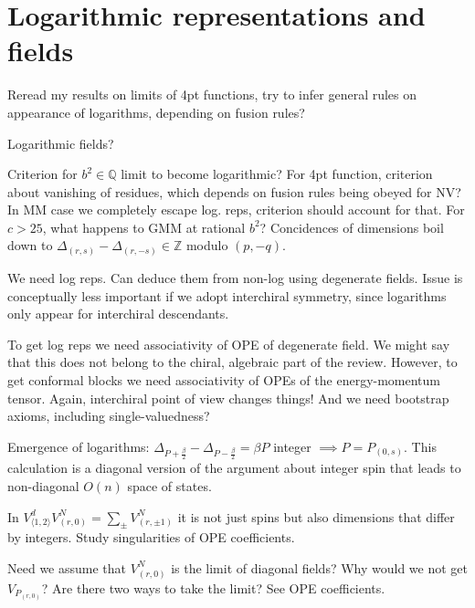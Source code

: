 \documentclass[12pt, a4paper]{article}
\theoremstyle{break}
\begin{document}
\section{Logarithmic representations and fields} \label{sec:log}

Reread my results on limits of 4pt functions, try to infer general rules on appearance of logarithms, depending on fusion rules?

Logarithmic fields?

Criterion for $b^2\in\mathbb{Q}$ limit to become logarithmic? For 4pt function, criterion about vanishing of residues, which depends on fusion rules being obeyed for NV? In MM case we completely escape log. reps, criterion should account for that.  
For $c>25$, what happens to GMM at rational $b^2$? Concidences of dimensions boil down to $\Delta_{(r,s)}-\Delta_{(r,-s)} \in \mathbb{Z}$ modulo $(p, -q)$. 

We need log reps. Can deduce them from non-log using degenerate fields. Issue is conceptually less important if we adopt interchiral symmetry, since logarithms only appear for interchiral descendants. 

To get log reps we need associativity of OPE of degenerate field. We might say that this does not belong to the chiral, algebraic part of the review. However, to get conformal blocks we need associativity of OPEs of the energy-momentum tensor. Again, interchiral point of view changes things! And we need bootstrap axioms, including single-valuedness? 

Emergence of logarithms: $\Delta_{P+\frac{\beta}{2}}-\Delta_{P-\frac{\beta}{2}} = \beta P$ integer $\implies P=P_{(0,s)}$. This calculation is a diagonal version of the argument about integer spin that leads to non-diagonal $O(n)$ space of states.

In $V^d_{\langle 1,2\rangle}V^N_{(r,0)} = \sum_\pm V^N_{(r,\pm 1)}$ it is not just spins but also dimensions that differ by integers. Study singularities of OPE coefficients. 

Need we assume that $V^N_{(r,0)}$ is the limit of diagonal fields? Why would we not get $V_{P_{(r,0)}}$? Are there two ways to take the limit? See OPE coefficients. 




%
\end{document}
